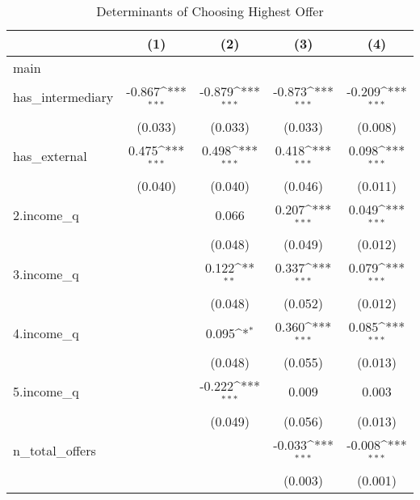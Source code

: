 \begin{table}[htbp]\centering
\def\sym#1{\ifmmode^{#1}\else\(^{#1}\)\fi}
\caption{Determinants of Choosing Highest Offer}
\begin{tabular}{l*{4}{c}}
\hline\hline
            &\multicolumn{1}{c}{(1)}         &\multicolumn{1}{c}{(2)}         &\multicolumn{1}{c}{(3)}         &\multicolumn{1}{c}{(4)}         \\
\hline
main        &                     &                     &                     &                     \\
has\_intermediary&      -0.867\sym{***}&      -0.879\sym{***}&      -0.873\sym{***}&      -0.209\sym{***}\\
            &     (0.033)         &     (0.033)         &     (0.033)         &     (0.008)         \\
[1em]
has\_external&       0.475\sym{***}&       0.498\sym{***}&       0.418\sym{***}&       0.098\sym{***}\\
            &     (0.040)         &     (0.040)         &     (0.046)         &     (0.011)         \\
[1em]
2.income\_q  &                     &       0.066         &       0.207\sym{***}&       0.049\sym{***}\\
            &                     &     (0.048)         &     (0.049)         &     (0.012)         \\
[1em]
3.income\_q  &                     &       0.122\sym{**} &       0.337\sym{***}&       0.079\sym{***}\\
            &                     &     (0.048)         &     (0.052)         &     (0.012)         \\
[1em]
4.income\_q  &                     &       0.095\sym{*}  &       0.360\sym{***}&       0.085\sym{***}\\
            &                     &     (0.048)         &     (0.055)         &     (0.013)         \\
[1em]
5.income\_q  &                     &      -0.222\sym{***}&       0.009         &       0.003         \\
            &                     &     (0.049)         &     (0.056)         &     (0.013)         \\
[1em]
n\_total\_offers&                     &                     &      -0.033\sym{***}&      -0.008\sym{***}\\
            &                     &                     &     (0.003)         &     (0.001)         \\

\end{tabular}
\end{table}
